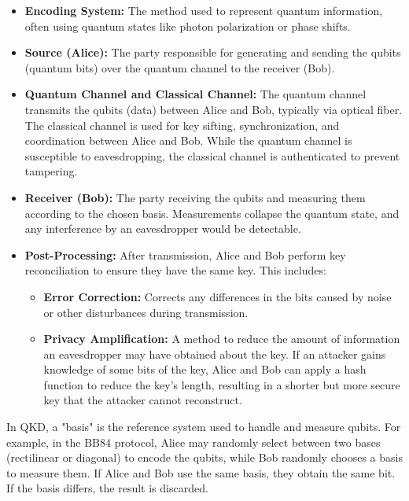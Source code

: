 \begin{itemize}
  \item \textbf{Encoding System:} The method used to represent quantum
    information, often using quantum states like photon polarization
    or phase shifts.
  \item \textbf{Source (Alice):} The party responsible for generating
    and sending the qubits (quantum bits) over the quantum channel to
    the receiver (Bob).
  \item \textbf{Quantum Channel and Classical Channel:} The quantum
    channel transmits the qubits (data) between Alice and Bob,
    typically via optical fiber. The classical channel is used for key
    sifting, synchronization, and coordination between Alice and Bob.
    While the quantum channel is susceptible to eavesdropping, the
    classical channel is authenticated to prevent tampering. 
  \item \textbf{Receiver (Bob):} The party receiving the qubits and
    measuring them according to the chosen basis. Measurements
    collapse the quantum state, and any interference by an
    eavesdropper would be detectable.
  \item \textbf{Post-Processing:} After transmission, Alice and Bob
    perform key reconciliation to ensure they have the same key. This
    includes:  
    \begin{itemize}
      \item \textbf{Error Correction:} Corrects any differences in the
        bits caused by noise or other disturbances during
        transmission.  
      \item \textbf{Privacy Amplification:} A method to reduce the
        amount of information an eavesdropper may have obtained about
        the key. If an attacker gains knowledge of some bits of the
        key, Alice and Bob can apply a hash function to reduce the
        key's length, resulting in a shorter but more secure key that
        the attacker cannot reconstruct.  
    \end{itemize}
\end{itemize}

In QKD, a "basis" is the reference system used to handle and measure
qubits. For example, in the BB84 protocol, Alice may randomly select
between two bases (rectilinear or diagonal) to encode the qubits,
while Bob randomly chooses a basis to measure them. If Alice and Bob
use the same basis, they obtain the same bit. If the basis differs,
the result is discarded.

